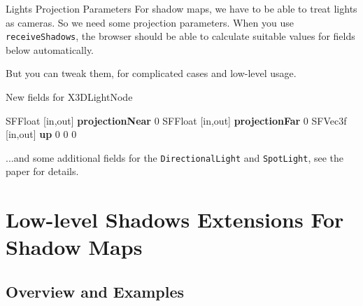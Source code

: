 \documentclass{beamer}
\newcommand*{\codeem}[1]{\textbf{#1}}
\begin{document}
\begin{frame}[fragile]{Lights Projection Parameters}
  For shadow maps, we have to be able to treat lights as cameras.
  So we need some projection parameters.
  When you use \texttt{receiveShadows},
  the browser should be able to calculate suitable values for
  fields below automatically.

  But you can tweak them, for complicated cases and low-level usage.

\begin{block}{New fields for X3DLightNode}
\begin{semiverbatim}
SFFloat  [in,out]  \codeem{projectionNear} 0
SFFloat  [in,out]  \codeem{projectionFar}  0
SFVec3f  [in,out]  \codeem{up} 0 0 0
\end{semiverbatim}
\end{block}

  ...and some additional fields for the \texttt{DirectionalLight}
  and \texttt{SpotLight}, see the paper for details.


\end{frame}

\section{Low-level Shadows Extensions For Shadow Maps}

\subsection{Overview and Examples}
\end{document}
